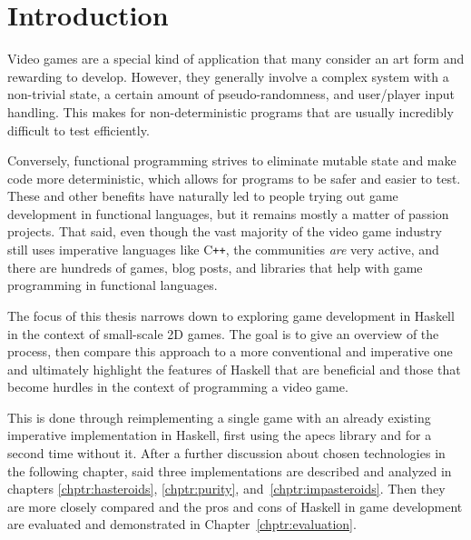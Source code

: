 \documentclass[
  digital, %
  color,   %
  table,   %
  oneside, %
  lof,     %
  lot,     %
]{fithesis3}
\newcommand{\cpp}{C\nolinebreak\texttt{+}\nolinebreak\texttt{+}}
\begin{document}
\chapter*{Introduction}
\label{chptr:introduction}


Video games are a special kind of application that many consider an art form
and rewarding to develop. However, they generally involve a complex system
with a non-trivial state, a certain amount of pseudo-randomness,
and user/player input handling. This makes for non-deterministic
programs that are usually incredibly difficult to test efficiently.

Conversely, functional programming strives to eliminate
mutable state and make code more deterministic, which allows for
programs to be safer and easier to test.
These and other benefits have naturally led to people
trying out game development in functional languages, but
it remains mostly a matter of passion projects.
That said, even though the vast majority of the video game industry
still uses imperative languages like \cpp{}, the communities
\emph{are} very active, and there are hundreds of games,
blog posts, and libraries that help with
game programming in functional languages.

The focus of this thesis narrows down to exploring game development
in Haskell in the context of small-scale 2D games. The goal is
to give an overview of the process, then compare this approach
to a more conventional and imperative one
and ultimately highlight the features of Haskell that are beneficial
and those that become hurdles in the context of programming a video game.

This is done through reimplementing a single game with an already existing
imperative implementation in Haskell,
first using the apecs library
and for a second time without it. After a further discussion
about chosen technologies in the following chapter,
said three implementations are described and analyzed
in chapters \ref{chptr:hasteroids}, \ref{chptr:purity}, and~\ref{chptr:impasteroids}.
Then they are more closely compared
and the pros and cons of Haskell in game development are
evaluated and demonstrated in Chapter~\ref{chptr:evaluation}.
\end{document}
